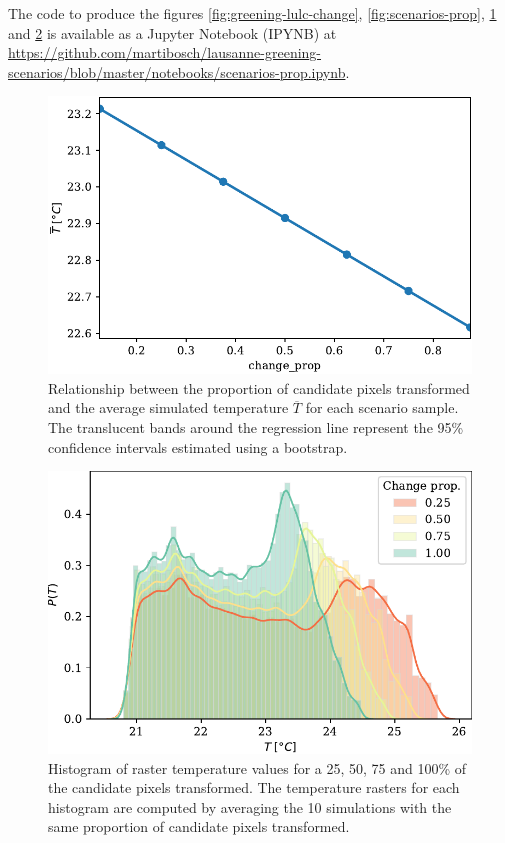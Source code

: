 \documentclass[10pt,letterpaper]{article}
\begin{document}
The code to produce the figures \ref{fig:greening-lulc-change}, \ref{fig:scenarios-prop}, \ref{fig:scenarios-prop-regplot} and \ref{fig:scenarios-prop-hists} is available as a Jupyter Notebook (IPYNB) at \url{https://github.com/martibosch/lausanne-greening-scenarios/blob/master/notebooks/scenarios-prop.ipynb}.

\begin{figure}[ht]
  \centering
  \includegraphics[width=.6\textwidth]{figures/scenarios-prop-regplot}
  \caption{\label{fig:scenarios-prop-regplot} Relationship between the proportion of candidate pixels transformed and the average simulated temperature $\overline{T}$ for each scenario sample. The translucent bands around the regression line represent the 95\% confidence intervals estimated using a bootstrap.}
\end{figure}


\begin{figure}[ht]
  \centering
  \includegraphics[width=.6\textwidth]{figures/scenarios-prop-hists}
  \caption{\label{fig:scenarios-prop-hists} Histogram of raster temperature values for a 25, 50, 75 and 100\% of the candidate pixels transformed. The temperature rasters for each histogram are computed by averaging the 10 simulations with the same proportion of candidate pixels transformed.}
\end{figure}
\end{document}
